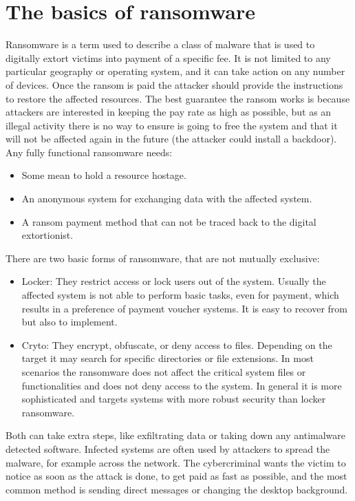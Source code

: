 \section{The basics of ransomware}
Ransomware is a term used to describe a class of malware that is used to digitally extort victims into payment of a specific fee.
It is not limited to any particular geography or operating system, and it can take action on any number of devices\cite{ransomware_oReilly}.
\linej
Once the ransom is paid the attacker should provide the instructions to restore the affected resources.
The best guarantee the ransom works is because attackers are interested in keeping the pay rate as high as possible, but as an illegal activity there is no way to ensure is going to free the system and that it will not be affected again in the future (the attacker could install a backdoor).
\linej
\linej
Any fully functional ransomware needs\cite{ransomware_digital_extortion}:
\begin{itemize}
\item Some mean to hold a resource hostage.
\item An anonymous system for exchanging data with the affected system.
\item A ransom payment method that can not be traced back to the digital extortionist.
\end{itemize}
\linej
There are two basic forms of ransomware, that are not mutually exclusive\cite{ransomware_oReilly}\cite{ransomware_digital_extortion}:
\begin{itemize}
	\item Locker: They restrict access or lock users out of the system.
	Usually the affected system is not able to perform basic tasks, even for payment, which results in a preference of payment voucher systems.
	It is easy to recover from but also to implement.
	\item Cryto: They encrypt, obfuscate, or deny access to files.
	Depending on the target it may search for specific directories or file extensions.
	In most scenarios the ransomware does not affect the critical system files or functionalities and does not deny access to the system.
	In general it is more sophisticated and targets systems with more robust security than locker ransomware.
\end{itemize}
\linej
Both can take extra steps, like exfiltrating data or taking down any antimalware detected software.
Infected systems are often used by attackers to spread the malware, for example across the network.
The cybercriminal wants the victim to notice as soon as the attack is done, to get paid as fast as possible, and the most common method is sending direct messages or changing the desktop background.
